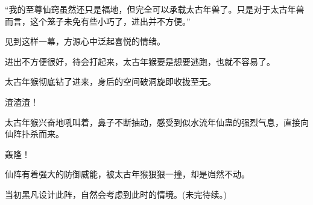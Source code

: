 \begin{this_body}
“我的至尊仙窍虽然还只是福地，但完全可以承载太古年兽了。只是对于太古年兽而言，这个笼子未免有些小巧了，进出并不方便。”

见到这样一幕，方源心中泛起喜悦的情绪。

进出不方便很好，待会打起来，太古年猴要是想要逃跑，也就不容易了。

太古年猴彻底钻了进来，身后的空间破洞旋即收拢至无。

渣渣渣！

太古年猴兴奋地吼叫着，鼻子不断抽动，感受到似水流年仙蛊的强烈气息，直接向仙阵扑杀而来。

轰隆！

仙阵有着强大的防御威能，被太古年猴狠狠一撞，却是岿然不动。

当初黑凡设计此阵，自然会考虑到此时的情境。(未完待续。)

\end{this_body}

